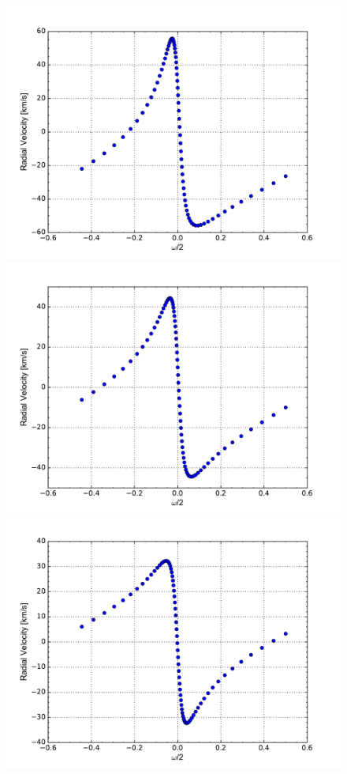 \documentclass[onecolumn]{aastex6}
\begin{document}
\begin{figure}[ht]
  \includegraphics[scale=0.3]{f.pdf} \\%
  \includegraphics[scale=0.3]{g.pdf}%
  \includegraphics[scale=0.3]{h.pdf}%

\end{figure}
\end{document}
